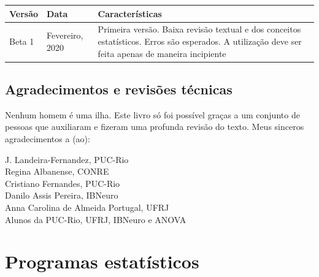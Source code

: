 \documentclass[
]{book}
\begin{document}
\begin{longtable}[]{@{}lll@{}}
\toprule
\begin{minipage}[b]{0.24\columnwidth}\raggedright
Versão\strut
\end{minipage} & \begin{minipage}[b]{0.34\columnwidth}\raggedright
Data\strut
\end{minipage} & \begin{minipage}[b]{0.34\columnwidth}\raggedright
Características\strut
\end{minipage}\tabularnewline
\midrule
\endhead
\begin{minipage}[t]{0.24\columnwidth}\raggedright
Beta 1\strut
\end{minipage} & \begin{minipage}[t]{0.34\columnwidth}\raggedright
Fevereiro, 2020\strut
\end{minipage} & \begin{minipage}[t]{0.34\columnwidth}\raggedright
Primeira versão. Baixa revisão textual e dos conceitos estatísticos.
Erros são esperados. A utilização deve ser feita apenas de maneira
incipiente\strut
\end{minipage}\tabularnewline
\bottomrule
\end{longtable}

\hypertarget{agradecimentos-e-revisuxf5es-tuxe9cnicas}{%
\section{Agradecimentos e revisões
técnicas}\label{agradecimentos-e-revisuxf5es-tuxe9cnicas}}

Nenhum homem é uma ilha. Este livro só foi possível graças a um conjunto
de pessoas que auxiliaram e fizeram uma profunda revisão do texto. Meus
sinceros agradecimentos a (ao):

J. Landeira-Fernandez, PUC-Rio\\
Regina Albanense, CONRE\\
Cristiano Fernandes, PUC-Rio\\
Danilo Assis Pereira, IBNeuro\\
Anna Carolina de Almeida Portugal, UFRJ\\
Alunos da PUC-Rio, UFRJ, IBNeuro e ANOVA

\hypertarget{programas-estatuxedsticos}{%
\chapter{Programas estatísticos}\label{programas-estatuxedsticos}}
\end{document}
